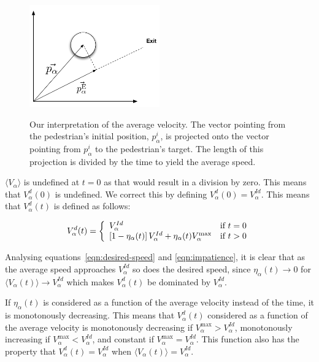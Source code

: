 \begin{figure}[ht]
    \centering
    {\includegraphics[width=0.5\textwidth]{Figures/NotationOfPedestrian2.pdf}} 
    \caption[Our interpretation of the average velocity]{Our interpretation of 
    the average velocity. The vector pointing from the pedestrian's initial 
    position, $p^i_\alpha$, is projected onto the vector pointing from 
    $p^i_\alpha$ to the pedestrian's target. The length of this projection is 
    divided by the time to yield the average speed.}
    \label{impatience}
\end{figure}

$\langle V_{\alpha}\rangle$ is undefined at $t=0$ as that would result in a 
division by zero. This means that $V^d_\alpha(0)$ is undefined. We correct 
this by defining $V^d_\alpha(0)=V^{Id}_\alpha$. This means that $V^d_\alpha(t)$ 
is defined as follows:

\begin{equation}\label{eqn:cond-define}
    V_{\alpha}^{d} (t) = \left\{ 
    \begin{array}{l l}
        V_\alpha^{Id} & \text{if $t=0$}\\
        \left[ 1 - \eta_{\alpha}(t) \right] 
        V^{Id}_{\alpha} +
        \eta_{\alpha}(t) V_{\alpha}^{\text{max}}
        & \text{if $t > 0$}\\
    \end{array} \right.
\end{equation}

Analysing equations~\eqref{eqn:desired-speed} and \eqref{eqn:impatience}, it 
is clear that as the average speed approaches $V^{Id}_\alpha$ so does the 
desired speed, since $\eta_\alpha(t)\rightarrow0$ for $\langle V_\alpha(t) 
\rangle \rightarrow V^{Id}_\alpha$ which makes $V^d_\alpha(t)$ be dominated by 
$V^{Id}_\alpha$.  


If $\eta_\alpha(t)$ is considered as a function of the average velocity 
instead of the time, it is monotonously decreasing. This means that 
$V^d_\alpha(t)$ considered as a function of the average velocity is 
monotonously decreasing if $V^{\text{max}}_\alpha > V^{Id}_\alpha$, 
monotonously increasing if $V^{\text{max}}_\alpha < V^{Id}_\alpha$, and 
constant if $V^{\text{max}}_\alpha = V^{Id}_\alpha$. This function also has 
the property that $V^d_\alpha(t)=V^{Id}_\alpha$ when $\langle V_\alpha(t) 
\rangle = V^{Id}_\alpha$.


